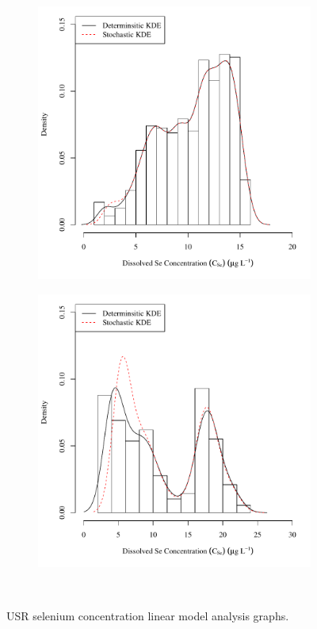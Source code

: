 \subfiguremid
\begin{landscape}
	\begin{figure}
		\begin{subfigure}{0.7\textwidth}
			\centering
			\includegraphics[width=\tableCustomSize]{"Figures/Results_USR/Stochastic/c d&s est RFD"}
		\end{subfigure}%
		\begin{subfigure}{0.7\textwidth}
			\centering
			\includegraphics[width=\tableCustomSize]{"Figures/Results_USR/Stochastic/c d&s est TIM"}
		\end{subfigure}\\
		\caption{USR selenium concentration linear model analysis graphs.}
	\end{figure}
\end{landscape}

